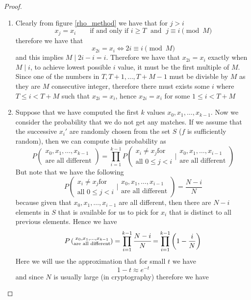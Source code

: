 \documentclass[a4 paper]{article}
\newcommand{\?}{\stackrel{?}{=}}
\begin{document}
\begin{tcolorbox}[breakable,colback=blue!5!white, colframe=blue!50!black]
\begin{proof}
\begin{enumerate}
    \item Clearly from figure \ref*{rho_method} we have that for $ j > i $
    $$ x_j  = x _i \qquad \text{if and only if } i \geq T \; \text{ and } \; j \equiv i \pmod M $$
    therefore we have that 
    $$ x_{2i} = x_i \iff 2i \equiv i \pmod M $$
    and this implies $ M \mid 2i - i = i $. Therefore we have that $ x_{2i} =
 x_i $ exactly when $ M \mid i  $, to achieve lowest possible $ i $ value, it must be the first multiple of $ M $. Since one of the numbers in $ T, T+1, \dots, T+M-1 $ must be divisble by $ M $ as they are $ M $ consecutive integer, therefore there must exists some $ i $ where $ T\leq i < T+M  $  such that $ x_{2i} = x_i $, hence $ x_{2i} = x_i $ for some $ 1\leq i < T+M $
    \item Suppose that we have computed the first $ k $ values $ x_0 , x_1 ,  \dots, x_{k-1}$. Now we consider the probability that we do not get any matches. If we assume that the successive $ x_i' $ are randomly chosen from the set $ S $ ($ f $ is sufficiently random), then we can compute this probability as 
    $$ P\left( \substack{x_0 , x_1 , \dots, x_{k-1} \\ \text{are all different}}\right) = \prod\limits_{i = 1}^{k-1} P \left(\substack{x_i \neq x_j \text{for} \\ \text{all } 0\leq j < i} \bigg| \substack{x_0 ,x_1 ,\dots, x_{i-1} \\ \text{are all different}}\right) $$
But note that we have the following 
 $$ P \left(\substack{x_i \neq x_j \text{for} \\ \text{all } 0\leq j < i} \bigg| \substack{x_0 ,x_1 ,\dots, x_{i-1} \\ \text{are all different}}\right) = \frac{N-i}{N}   $$
 because given that $ x_0 ,x_1 ,\dots, x_{i-1} $ are all different, then there are $ N-i $ elements in $ S $ that is available for us to pick for $ x_i $ that is distinct to all previous elements. Hence we have 
 $$ P\left( \substack{x_0 , x_1 , \dots, x_{k-1} \\ \text{are all different}}\right) = \prod\limits_{i = 1}^{k-1} \cfrac{N-i    }{N} = \prod\limits_{i = 1}^{k-1} \left(1 - \frac{i}{N}\right)    $$
 Here we will use the approximation that for small $ t $ we have 
$$ 1 - t \approx e^{-t} $$
and since $ N $ is usually large (in cryptography) therefore we have 

\end{enumerate}
\end{proof}
\end{tcolorbox}
\end{document}
